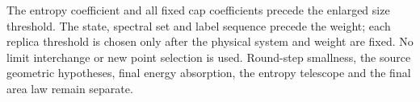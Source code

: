 The entropy coefficient and all fixed cap coefficients precede the enlarged
size threshold.  The state, spectral set and label sequence precede the
weight; each replica threshold is chosen only after the physical system
and weight are fixed.  No limit interchange or new point selection is used.
Round-step smallness, the source geometric hypotheses, final energy
absorption, the entropy telescope and the final area law remain separate.
